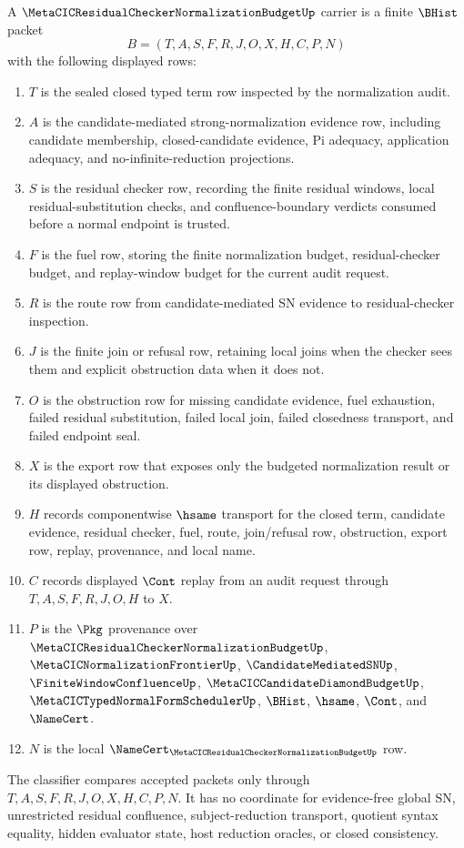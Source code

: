 \begin{definition}
\label{def:metacic-residual-checker-normalization-budget-carrier}
A $\MetaCICResidualCheckerNormalizationBudgetUp$ carrier is a finite $\BHist$ packet
$$
B=(T,A,S,F,R,J,O,X,H,C,P,N)
$$
with the following displayed rows:
\begin{enumerate}
\item $T$ is the sealed closed typed term row inspected by the normalization audit.
\item $A$ is the candidate-mediated strong-normalization evidence row, including candidate membership, closed-candidate evidence, Pi adequacy, application adequacy, and no-infinite-reduction projections.
\item $S$ is the residual checker row, recording the finite residual windows, local residual-substitution checks, and confluence-boundary verdicts consumed before a normal endpoint is trusted.
\item $F$ is the fuel row, storing the finite normalization budget, residual-checker budget, and replay-window budget for the current audit request.
\item $R$ is the route row from candidate-mediated SN evidence to residual-checker inspection.
\item $J$ is the finite join or refusal row, retaining local joins when the checker sees them and explicit obstruction data when it does not.
\item $O$ is the obstruction row for missing candidate evidence, fuel exhaustion, failed residual substitution, failed local join, failed closedness transport, and failed endpoint seal.
\item $X$ is the export row that exposes only the budgeted normalization result or its displayed obstruction.
\item $H$ records componentwise $\hsame$ transport for the closed term, candidate evidence, residual checker, fuel, route, join/refusal row, obstruction, export row, replay, provenance, and local name.
\item $C$ records displayed $\Cont$ replay from an audit request through $T,A,S,F,R,J,O,H$ to $X$.
\item $P$ is the $\Pkg$ provenance over $\MetaCICResidualCheckerNormalizationBudgetUp$, $\MetaCICNormalizationFrontierUp$, $\CandidateMediatedSNUp$, $\FiniteWindowConfluenceUp$, $\MetaCICCandidateDiamondBudgetUp$, $\MetaCICTypedNormalFormSchedulerUp$, $\BHist$, $\hsame$, $\Cont$, and $\NameCert$.
\item $N$ is the local $\NameCert_{\MetaCICResidualCheckerNormalizationBudgetUp}$ row.
\end{enumerate}
The classifier compares accepted packets only through $T,A,S,F,R,J,O,X,H,C,P,N$. It has no coordinate for evidence-free global SN, unrestricted residual confluence, subject-reduction transport, quotient syntax equality, hidden evaluator state, host reduction oracles, or closed consistency.
\end{definition}

